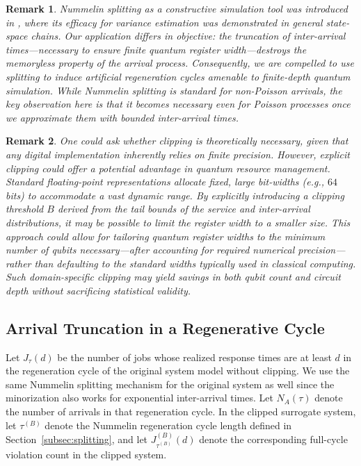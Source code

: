 \documentclass[11pt]{article}
\newtheorem{remark}{Remark}
\begin{document}
\begin{remark}
Nummelin splitting as a constructive simulation tool was introduced in \cite{henderson2001regenerative}, where its efficacy for variance estimation was demonstrated in general state-space chains. Our application differs in objective: the truncation of inter-arrival times---necessary to ensure finite quantum register width---destroys the memoryless property of the arrival process. Consequently, we are compelled to use splitting to induce artificial regeneration cycles amenable to finite-depth quantum simulation. While Nummelin splitting is standard for non-Poisson arrivals, the key observation here is that it becomes necessary even for Poisson processes once we approximate them with bounded inter-arrival times.
\end{remark}

\begin{remark}
One could ask whether clipping is theoretically necessary, given that any digital implementation inherently relies on finite precision. However, explicit clipping could offer a potential advantage in quantum resource management. Standard floating-point representations allocate fixed, large bit-widths (e.g., $64$ bits) to accommodate a vast dynamic range. By explicitly introducing a clipping threshold $B$ derived from the tail bounds of the service and inter-arrival distributions, it may be possible to limit the register width to a smaller size. This approach could allow for tailoring quantum register widths to the minimum number of qubits necessary---after accounting for required numerical precision---rather than defaulting to the standard widths typically used in classical computing. Such domain-specific clipping may yield savings in both qubit count and circuit depth without sacrificing statistical validity.
\end{remark}

\subsection{Arrival Truncation in a Regenerative Cycle}
\label{subsec:jsq-truncation}

Let 
$J_\tau(d)$ be the number of jobs whose realized response times are at
least $d$ in the regeneration cycle of the original system model without clipping. We use the same Nummelin splitting mechanism for the original system as well since the minorization also works for exponential inter-arrival times. 
Let $N_A(\tau)$ denote
the number of arrivals in that regeneration cycle.
In the clipped surrogate system, let $\tau^{(B)}$ denote the Nummelin regeneration
cycle length defined in Section~\ref{subsec:splitting}, and let
$J_{\tau^{(B)}}^{(B)}(d)$ denote the corresponding full-cycle violation count in
the clipped system.
\end{document}
